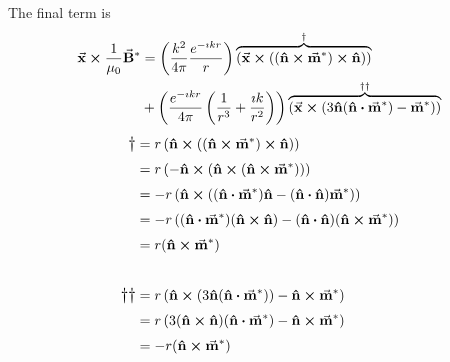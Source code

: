 \documentclass[a4paper,twoside]{article}
\begin{document}
\begin{itemize}
\begin{problem}
            The final term is
            \begin{align}
                \va{x} \cross \frac{1}{\mu_0} \va{B}^* &= \left(\frac{k^2}{4 \pi} \frac{e^{-\imath kr}}{r} \right) \overbrace{( \va{x} \cross ( (\vu{n} \cross \va{m}^*) \cross \vu{n}))}^{\dagger} \\
                &+ \left( \frac{e^{-\imath kr}}{4 \pi} \left( \frac{1}{r^3} + \frac{\imath k}{r^2} \right) \right) \overbrace{( \va{x} \cross ( 3\vu{n} ( \vu{n} \vdot \va{m}^*) - \va{m}^*))}^{\dagger\dagger}
            \end{align}
            \begin{align}
                \mathlarger{\dagger} &= r \left( \vu{n} \cross ( (\vu{n} \cross \va{m}^*) \cross \vu{n}) \right) \\
                &= r \left( - \vu{n} \cross ( \vu{n} \cross ( \vu{n} \cross \va{m}^*)) \right) \\
                &= - r \left( \vu{n} \cross ((\vu{n} \vdot \va{m}^*) \vu{n} - (\vu{n} \vdot \vu{n}) \va{m}^*) \right) \\
                &= - r \left( (\vu{n} \vdot \va{m}^*)( \vu{n} \cross \vu{n}) - (\vu{n} \vdot \vu{n})( \vu{n} \cross \va{m}^*) \right) \\
                &= r( \vu{n} \cross \va{m}^*) \\\\
                \mathlarger{\dagger\dagger} &= r \left( \vu{n} \cross (3 \vu{n} ( \vu{n} \vdot \va{m}^*)) - \vu{n} \cross \va{m}^* \right) \\
                &= r \left(3 (\vu{n} \cross \vu{n}) (\vu{n} \vdot \va{m}^*) - \vu{n} \cross \va{m}^* \right) \\
                &= -r (\vu{n} \cross \va{m}^*)
            \end{align}


\end{problem}
\end{itemize}
\end{document}
